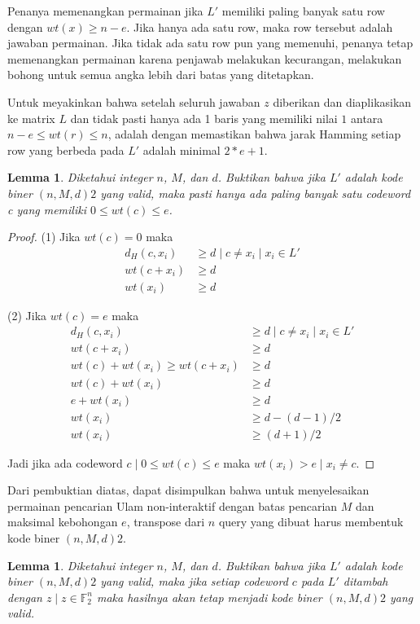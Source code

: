 \documentclass[conference,compsoc]{IEEEtran}
\newtheorem{lemma}[theorem]{Lemma}
\begin{document}
Penanya memenangkan permainan jika $L'$ memiliki paling banyak satu row dengan $wt(x) \ge n-e$. Jika hanya ada satu row, maka row tersebut adalah jawaban permainan. Jika tidak ada satu row pun yang memenuhi, penanya tetap memenangkan permainan karena penjawab melakukan kecurangan, melakukan bohong untuk semua angka lebih dari batas yang ditetapkan.

Untuk meyakinkan bahwa setelah seluruh jawaban $z$ diberikan dan diaplikasikan ke matrix $L$ dan tidak pasti hanya ada 1 baris yang memiliki nilai $1$ antara $n-e \le wt(r) \le n$, adalah dengan memastikan bahwa jarak Hamming setiap row yang berbeda pada $L'$ adalah minimal $2*e+1$.

\begin{lemma}
Diketahui integer $n$, $M$, dan $d$. Buktikan bahwa jika $L'$ adalah kode biner $(n,M,d)2$ yang valid, maka pasti hanya ada paling banyak satu codeword c yang memiliki $0 \le wt(c) \le e$.  
\end{lemma}

\begin{proof}
(1) Jika $wt(c) = 0$ maka
\begin{align*}
d_H(c,x_i) &\ge d \mid c \neq x_i \mid x_i \in L' \\
wt(c + x_i) &\ge d \\
wt(x_i) &\ge d
\end{align*}

(2) Jika $wt(c) = e$ maka
\begin{align*}
d_H(c,x_i) &\ge d \mid c \neq x_i \mid x_i \in L' \\
wt(c+x_i) &\ge d \\
wt(c) + wt(x_i) \ge wt(c+x_i) &\ge d \\
wt(c) + wt(x_i) &\ge d \\
e + wt(x_i) &\ge d \\
wt(x_i) &\ge d - (d-1)/2 \\
wt(x_i) &\ge (d+1)/2
\end{align*}

Jadi jika ada codeword $c \mid 0 \le wt(c) \le e$ maka $wt(x_i) > e \mid x_i \neq c$.
\end{proof}

Dari pembuktian diatas, dapat disimpulkan bahwa untuk menyelesaikan permainan pencarian Ulam non-interaktif dengan batas pencarian $M$ dan maksimal kebohongan $e$, transpose dari $n$ query yang dibuat harus membentuk kode biner $(n,M,d)2$.

\begin{lemma}
Diketahui integer $n$, $M$, dan $d$. Buktikan bahwa jika $L'$ adalah kode biner $(n,M,d)2$ yang valid, maka jika setiap codeword $c$ pada $L'$ ditambah dengan $z \mid z \in \mathbb{F}_2^n$ maka hasilnya akan tetap menjadi kode biner $(n,M,d)2$ yang valid.  
\end{lemma}
\end{document}
